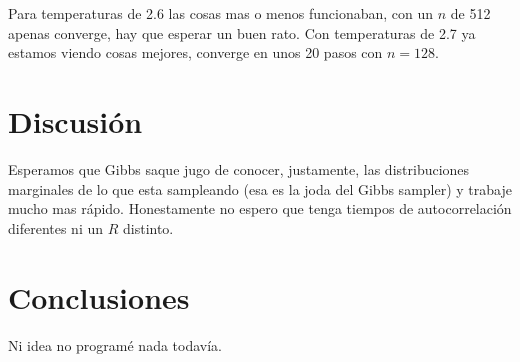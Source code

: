 \documentclass[a4paper, 12pt]{article}
\begin{document}
Para temperaturas de 2.6 las cosas mas o menos funcionaban, con un $n$ de 512 apenas converge, hay que esperar un buen rato. Con temperaturas de 2.7 ya estamos viendo cosas mejores, converge en unos 20 pasos con $n = 128$.

\section{Discusión}

Esperamos que Gibbs saque jugo de conocer, justamente, las distribuciones marginales de lo que esta sampleando (esa es la joda del Gibbs sampler) y trabaje mucho mas rápido. Honestamente no espero que tenga tiempos de autocorrelación diferentes ni un $\hat{R}$ distinto.

\section{Conclusiones}

Ni idea no programé nada todavía.

\printbibliography
\end{document}
